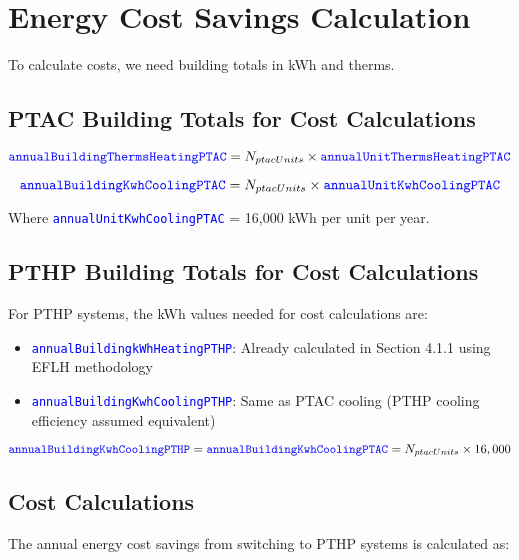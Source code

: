 \documentclass{article}
\newcommand{\code}[1]{\textcolor{blue}{\texttt{#1}}}
\begin{document}
\section{Energy Cost Savings Calculation}

To calculate costs, we need building totals in kWh and therms.

\subsection{PTAC Building Totals for Cost Calculations}

\begin{equation}
\code{annualBuildingThermsHeatingPTAC} = N_{ptacUnits} \times \code{annualUnitThermsHeatingPTAC}
\end{equation}

\begin{equation}
\code{annualBuildingKwhCoolingPTAC} = N_{ptacUnits} \times \code{annualUnitKwhCoolingPTAC}
\end{equation}

Where \code{annualUnitKwhCoolingPTAC} = 16,000 kWh per unit per year.

\subsection{PTHP Building Totals for Cost Calculations}

For PTHP systems, the kWh values needed for cost calculations are:

\begin{itemize}
    \item \code{annualBuildingkWhHeatingPTHP}: Already calculated in Section 4.1.1 using EFLH methodology
    \item \code{annualBuildingKwhCoolingPTHP}: Same as PTAC cooling (PTHP cooling efficiency assumed equivalent)
\end{itemize}

\begin{equation}
\code{annualBuildingKwhCoolingPTHP} = \code{annualBuildingKwhCoolingPTAC} = N_{ptacUnits} \times 16,000
\end{equation}

\subsection{Cost Calculations}

The annual energy cost savings from switching to PTHP systems is calculated as:
\end{document}

